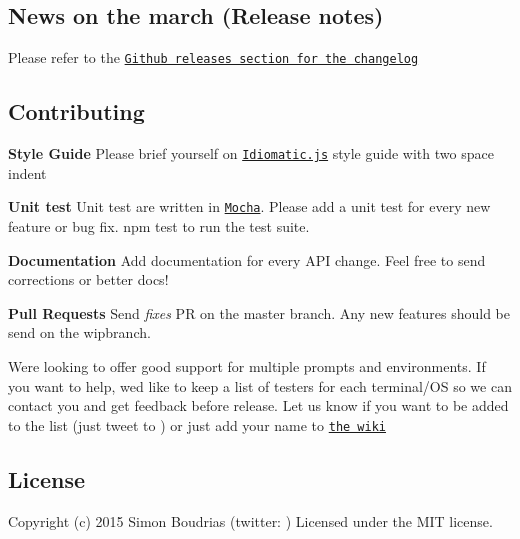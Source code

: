 \subsection*{News on the march (Release notes)}

Please refer to the \href{https://github.com/SBoudrias/Inquirer.js/releases}{\tt Github releases section for the changelog}

\subsection*{Contributing}

{\bfseries Style Guide} Please brief yourself on \href{https://github.com/rwldrn/idiomatic.js}{\tt Idiomatic.\+js} style guide with two space indent

{\bfseries Unit test} Unit test are written in \href{https://mochajs.org/}{\tt Mocha}. Please add a unit test for every new feature or bug fix. {\ttfamily npm test} to run the test suite.

{\bfseries Documentation} Add documentation for every A\+PI change. Feel free to send corrections or better docs!

{\bfseries Pull Requests} Send {\itshape fixes} PR on the {\ttfamily master} branch. Any new features should be send on the {\ttfamily wip}branch.

We\textquotesingle{}re looking to offer good support for multiple prompts and environments. If you want to help, we\textquotesingle{}d like to keep a list of testers for each terminal/\+OS so we can contact you and get feedback before release. Let us know if you want to be added to the list (just tweet to ) or just add your name to \href{https://github.com/SBoudrias/Inquirer.js/wiki/Testers}{\tt the wiki}

\subsection*{License}

Copyright (c) 2015 Simon Boudrias (twitter\+: ) Licensed under the M\+IT license. 